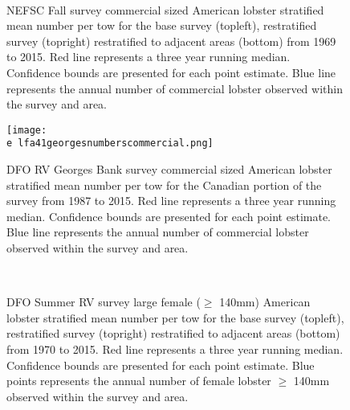 \documentclass[11pt]{article}
\newcommand{\e}{/backup/bio_data/bio.lobster/figures/} %
\begin{document}
\begin{figure}
\centering
{}
\\
\caption{NEFSC Fall survey commercial sized American lobster stratified mean number per tow for the base survey (topleft), restratified survey (topright) restratified to adjacent areas (bottom) from 1969 to 2015. Red line represents a three year running median. Confidence bounds are presented for each point estimate. Blue line represents the annual number of commercial lobster observed within the survey and area.}
\end{figure}
\clearpage

\begin{figure}

    \texttt{[image: \\e lfa41georgesnumberscommercial.png]}
    \caption{DFO RV Georges Bank survey commercial sized American lobster stratified mean number per tow for the Canadian portion of the survey from 1987 to 2015. Red line represents a three year running median. Confidence bounds are presented for each point estimate. Blue line represents the annual number of commercial lobster observed within the survey and area.}

\end{figure}



\begin{figure}
\centering
{}
\\
\caption{DFO Summer RV survey large female ($\geq$ 140mm) American lobster stratified mean number per tow for the base survey (topleft), restratified survey (topright) restratified to adjacent areas (bottom) from 1970 to 2015. Red line represents a three year running median. Confidence bounds are presented for each point estimate. Blue points represents the annual number of female lobster $\geq$ 140mm observed within the survey and area.}
\end{figure}
\clearpage
\end{document}
